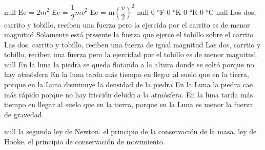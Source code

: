 \documentclass[10pt,a4paper]{article}
\begin{document}
\begin{multicols*}{2}
			{null}
				{Ec = $2m^2$}
				{Ec = $\dfrac{1}{2}mv^2$}
				{Ec = m$(\dfrac{v}{2})^2$}
			{null}
				{0 °F}
				{0 °K}
				{0 °R}
				{0 °C}
			{null}
				{Los dos, carrito y tobillo, reciben una fuerza pero la ejercida por el carrito es de menor magnitud}
				{Solamente está prssente la fuerza que ejerce el tobillo sobre el carrtio}
				{Las dos, carrito y tobillo, reciben una fuerza de igual magnitud}
				{Las dos, carrtio y tobillo, reciben una fuerza pero la ejercidad por el tobillo es de menor magnitud.}
			{null}
				{En la luna la piedra se queda flotando a la altura donde se soltó porque no hay atmósfera}
				{En la luna tarda más tiempo en llegar al suelo que en la tierra, porque en la Luna disminuye la densidad de la piedra}
				{En la Luna la piedra cae más rápido porque no hay fricción debido a la atmósfera.}
				{En la luna tarda más tiempo en llegar al suelo que en la tierra, porque en la Luna es menor la fuerza de gravedad.}
				
			{null}
				{la segunda ley de Newton.}
				{el principio de la conservación de la masa.}
				{ley de Hooke.}
				{el principio de conservación de movimiento.}

\end{multicols*}
\end{document}
